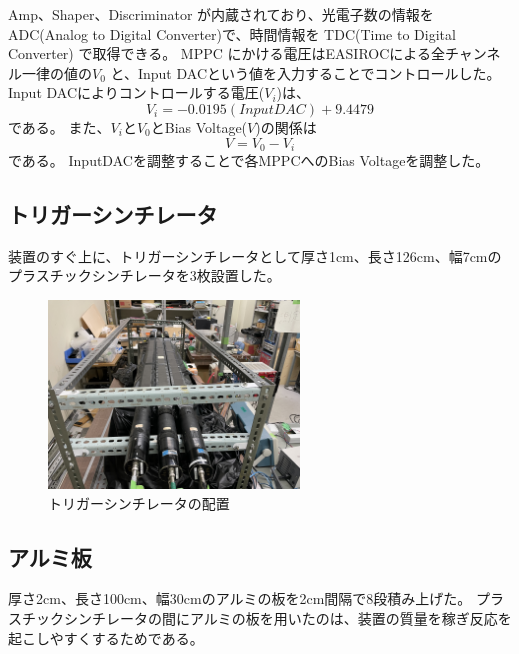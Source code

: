 Amp、Shaper、Discriminator が内蔵されており、光電子数の情報をADC(Analog to Digital Converter)で、時間情報を TDC(Time to Digital Converter) で取得できる。
MPPC にかける電圧はEASIROCによる全チャンネル一律の値の$V_0$ と、Input DACという値を入力することでコントロールした。
Input DACによりコントロールする電圧($V_i$)は、
\begin{equation}
    V_i = -0.0195(InputDAC) + 9.4479
\end{equation}
である。
また、$V_i$と$V_0$とBias Voltage($V$)の関係は
\begin{equation}
    V = V_0 - V_i
\end{equation}
である。
InputDACを調整することで各MPPCへのBias Voltageを調整した。

\subsection{トリガーシンチレータ}
装置のすぐ上に、トリガーシンチレータとして厚さ1cm、長さ126cm、幅7cmのプラスチックシンチレータを3枚設置した。
\begin{figure}[H]
    \centering
    \includegraphics[height=5cm]{img/Trigger.jpeg}
    \caption{トリガーシンチレータの配置}
\end{figure}

\subsection{アルミ板}
厚さ2cm、長さ100cm、幅30cmのアルミの板を2cm間隔で8段積み上げた。
プラスチックシンチレータの間にアルミの板を用いたのは、装置の質量を稼ぎ反応を起こしやすくするためである。

